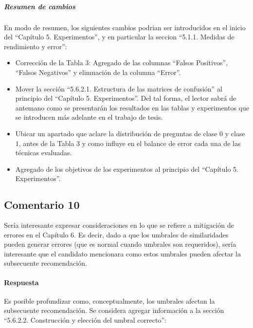 \subparagraph{Resumen de cambios}
En modo de resumen, los siguientes cambios podrian ser introducidos en el inicio del ``Capítulo 5. Experimentos'', y en particular la seccion ``5.1.1. Medidas de rendimiento y error'':
\begin{itemize}
	\item Corrección de la Tabla 3: Agregado de las columnas ``Falsos Positivos'', ``Falsos Negativos'' y elimnación de la columna ``Error''.
	\item Mover la sección ``5.6.2.1. Estructura de las matrices de confusión'' al principio del ``Capítulo 5. Experimentos''. Del tal forma, el lector sabrá de antemano como se presentarán los resultados en las tablas y experimentos que se introducen más adelante en el trabajo de tesis.
	\item Ubicar un apartado que aclare la distribución de preguntas de clase \(0\) y clase \(1\), antes de la Tabla 3 y como influye en el balance de error cada una de las técnicas evaluadas.
	\item Agregado de los objetivos de los experimentos al principio del ``Capítulo 5. Experimentos''.
\end{itemize}

\subsection*{Comentario 10}
Sería interesante expresar consideraciones en lo que se refiere a mitigación de errores en el Capítulo 6. Es decir, dado a que los umbrales de similaridades pueden generar errores (que es normal cuando umbrales son requeridos), sería interesante que el candidato mencionara como estos umbrales pueden afectar la subsecuente recomendación.

\paragraph*{Respuesta}
Es posible profundizar como, conceptualmente, los umbrales afectan la subsecuente recomendación. Se considera agregar información a la sección ``5.6.2.2. Construcción y elección del umbral correcto'':

